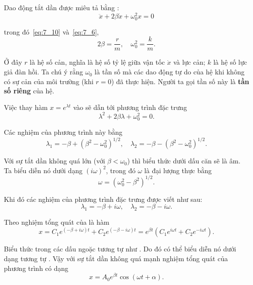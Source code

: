 Dao động tắt dần được miêu tả bằng :
\begin{equation*}
	\ddot{x} + 2\beta\dot{x} + \omega_0^2 x = 0
\end{equation*}

\noindent
trong đó~\eqref{eq:7_10} và~\eqref{eq:7_6},
\begin{equation*}
	2\beta = \frac{r}{m},\quad \omega_0^2 = \frac{k}{m}.
\end{equation*}

\noindent
Ở đây $r$ là hệ số cản, nghĩa là hệ số tỷ lệ giữa vận tốc $\dot{x}$ và lực cản; $k$ là hệ số lực giả đàn hồi. Ta chú ý rằng $\omega_0$ là tần số mà các dao động tự do của hệ khi không có sự cản của môi trường (khi $r=0$) đã thực hiện. Người ta gọi tần số này là \textbf{tần số riêng} của hệ.

Việc thay hàm $x=e^{\lambda t}$ vào  sẽ dẫn tới phương trình đặc trưng
\begin{equation}\label{eq:7_98}
	\lambda^2 + 2\beta\lambda + \omega_0^2 = 0.
\end{equation}

\noindent
Các nghiệm của phương trình này bằng
\begin{equation}\label{eq:7_99}
	\lambda_1 = -\beta + \left(\beta^2 - \omega_0^2\right)^{1/2},\quad \lambda_2 = -\beta - \left(\beta^2 - \omega_0^2\right)^{1/2}.
\end{equation}

Với sự tắt dần không quá lớn (với $\beta<\omega_0$) thì biểu thức dưới dấu căn sẽ là âm. Ta biểu diễn nó dưới dạng $(i\omega)^2$, trong đó $\omega$ là đại lượng thực bằng
\begin{equation}\label{eq:7_100}
	\omega = \left(\omega_0^2 - \beta^2\right)^{1/2}.
\end{equation}

\noindent
Khi đó các nghiệm của phương trình đặc trưng được viết như sau:
\begin{equation}\label{eq:7_101}
	\lambda_1 = -\beta + i\omega,\quad \lambda_2 = -\beta - i\omega.
\end{equation}

Theo  nghiệm tổng quát của  là hàm
\begin{equation*}
	x = C_1e^{(-\beta + i\omega)t} + C_2e^{(-\beta - i\omega)t} = e^{\beta t} \left(C_1e^{i\omega t} + C_2e^{-i\omega t}\right).
\end{equation*}

\noindent
Biểu thức trong các dấu ngoặc tương tự như . Do đó có thể biểu diễn nó dưới dạng tương tự . Vậy với sự tắt dần không quá mạnh nghiệm tổng quát của phương trình  có dạng
\begin{equation}\label{eq:7_102}
	x = A_0 e^{\beta t} \cos(\omega t + \alpha).
\end{equation}

